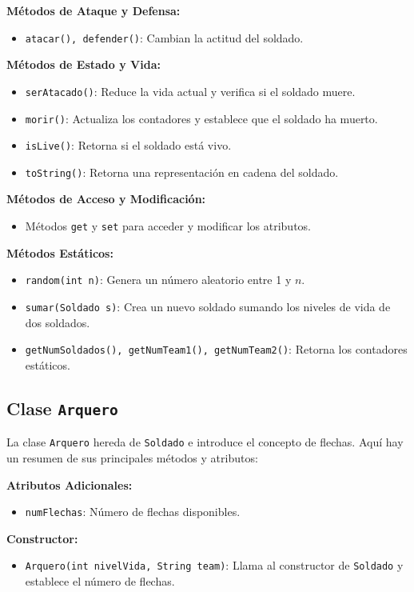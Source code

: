 \textbf{Métodos de Ataque y Defensa:}
\begin{itemize}
    \item \texttt{atacar(), defender()}: Cambian la actitud del soldado.
\end{itemize}

\textbf{Métodos de Estado y Vida:}
\begin{itemize}
    \item \texttt{serAtacado()}: Reduce la vida actual y verifica si el soldado muere.
    \item \texttt{morir()}: Actualiza los contadores y establece que el soldado ha muerto.
    \item \texttt{isLive()}: Retorna si el soldado está vivo.
    \item \texttt{toString()}: Retorna una representación en cadena del soldado.
\end{itemize}

\textbf{Métodos de Acceso y Modificación:}
\begin{itemize}
    \item Métodos \texttt{get} y \texttt{set} para acceder y modificar los atributos.
\end{itemize}

\textbf{Métodos Estáticos:}
\begin{itemize}
    \item \texttt{random(int n)}: Genera un número aleatorio entre 1 y $n$.
    \item \texttt{sumar(Soldado s)}: Crea un nuevo soldado sumando los niveles de vida de dos soldados.
    \item \texttt{getNumSoldados(), getNumTeam1(), getNumTeam2()}: Retorna los contadores estáticos.
\end{itemize}

\subsection{Clase \texttt{Arquero}}

La clase \texttt{Arquero} hereda de \texttt{Soldado} e introduce el concepto de flechas. Aquí hay un resumen de sus principales métodos y atributos:

\textbf{Atributos Adicionales:}
\begin{itemize}
    \item \texttt{numFlechas}: Número de flechas disponibles.
\end{itemize}

\textbf{Constructor:}
\begin{itemize}
    \item \texttt{Arquero(int nivelVida, String team)}: Llama al constructor de \texttt{Soldado} y establece el número de flechas.
\end{itemize}

